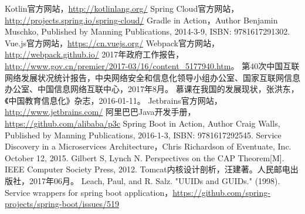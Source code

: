 \documentclass[titlepage,UTF8,linespread=1.5]{ctexart}
\begin{document}
\begin{thebibliography}{99}
     Kotlin官方网站，\url{http://kotlinlang.org/}
     Spring Cloud官方网站，\url{http://projects.spring.io/spring-cloud/}
     Gradle in Action，Author Benjamin Muschko, Published by Manning Publications, 2014-3-9, ISBN: 9781617291302.
     Vue.js官方网站，\url{https://cn.vuejs.org/}
     Webpack官方网站，\url{http://webpack.github.io/}
     2017年政府工作报告，\url{http://www.gov.cn/premier/2017-03/16/content_5177940.htm}。
     第40次中国互联网络发展状况统计报告，中央网络安全和信息化领导小组办公室、国家互联网信息办公室、中国信息网络互联中心，2017年8月。
     慕课在我国的发展现状，张洪东，《中国教育信息化》杂志，2016-01-11。
     Jetbrains官方网站，\url{http://www.jetbrains.com/}
     阿里巴巴Java开发手册，\url{https://github.com/alibaba/p3c}
     Spring Boot in Action, Author Craig Walls, Published by Manning Publications, 2016-1-3, ISBN: 9781617292545.
     Service Discovery in a Microservices Architecture，Chris Richardson of Eventuate, Inc. October 12, 2015.
     Gilbert S, Lynch N. Perspectives on the CAP Theorem[M]. IEEE Computer Society Press, 2012.
     Tomcat内核设计剖析，汪建著。人民邮电出版社，2017年06月。
     Leach, Paul, and R. Salz. "UUIDs and GUIDs." (1998).
     Service wrappers for spring boot application，\url{https://github.com/spring-projects/spring-boot/issues/519}
\end{thebibliography}
\end{document}
